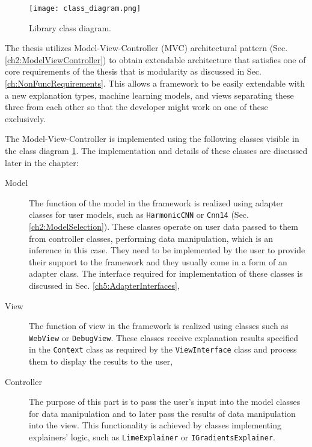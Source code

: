 \documentclass[
    bindingoffset=5mm,  %
    footnoteindent=3mm, %
    hyphenation=true    %
]{src/wut-thesis}
\begin{document}
\begin{figure}%
    \centering
    \texttt{[image: class\_diagram.png]}
    \caption{Library class diagram.}
    \label{fig:ClassDiagram}
\end{figure}

    The thesis utilizes Model-View-Controller (MVC) architectural pattern (Sec. \ref{ch2:ModelViewController}) to obtain extendable architecture that satisfies one of core requirements of the thesis that is modularity as discussed in Sec. \ref{ch:NonFuncRequirements}. This allows a framework to be easily extendable with a new explanation types, machine learning models, and views separating these three from each other so that the developer might work on one of these exclusively.

    The Model-View-Controller is implemented using
    the following classes visible in the class diagram \ref{fig:ClassDiagram}. The implementation and details of these classes are discussed later in the chapter:
    \begin{description}
        \item[Model] The function of the model in the framework is realized using adapter classes for user
        models, such as \texttt{HarmonicCNN} or \texttt{Cnn14} (Sec. \ref{ch2:ModelSelection}). These classes
        operate on user data passed to them from controller classes, performing data manipulation, which is an
        inference in this case. They need to be implemented by the user to provide their support to the framework and they usually come in a form of an adapter class.
        The interface required for implementation of these classes is discussed     
        in Sec. \ref{ch5:AdapterInterfaces},

        \item[View] The function of view in the framework is realized using classes such as \texttt{WebView}
        or \texttt{DebugView}. These classes receive explanation results specified in the \texttt{Context}
        class as required by the \texttt{ViewInterface} class and process them to display the results
        to the user,

        \item[Controller] The purpose of this part is to pass the user’s input into the model
        classes for data manipulation and to later pass the results of data manipulation into 
        the view. This functionality is achieved by classes implementing explainers' logic, 
        such as \texttt{LimeExplainer} or \texttt{IGradientsExplainer}.
    \end{description}
\end{document}
